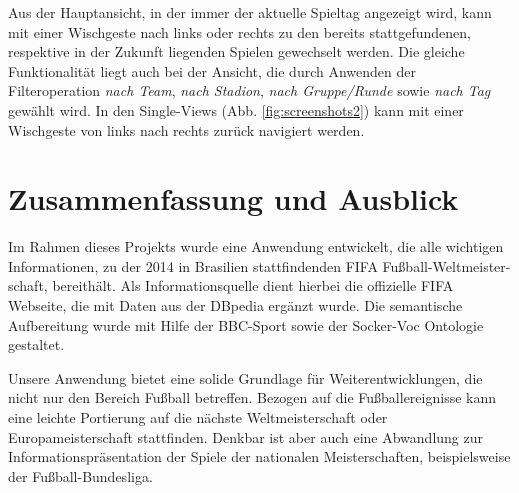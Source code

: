\documentclass[runningheads,a4paper]{llncs}
\begin{document}

Aus der Hauptansicht, in der immer der aktuelle Spieltag angezeigt wird, kann mit einer Wischgeste nach links oder rechts zu den bereits stattgefundenen, respektive in der Zukunft liegenden Spielen gewechselt werden. Die gleiche Funktionalität liegt auch bei der Ansicht, die durch Anwenden der Filteroperation \textit{nach Team}, \textit{nach Stadion}, \textit{nach Gruppe/Runde} sowie \textit{nach Tag} gewählt wird.
In den Single-Views (Abb. \ref{fig:screenshots2}) kann mit einer Wischgeste von links nach rechts zurück navigiert werden.

\newpage

\section{Zusammenfassung und Ausblick}

Im Rahmen dieses Projekts wurde eine Anwendung entwickelt, die alle wichtigen Informationen, zu der 2014 in Brasilien stattfindenden FIFA Fußball-Weltmeister-schaft, bereithält. Als Informationsquelle dient hierbei die offizielle FIFA Webseite, die mit Daten aus der DBpedia ergänzt wurde. Die semantische Aufbereitung wurde mit Hilfe der BBC-Sport sowie der Socker-Voc Ontologie gestaltet.  

Unsere Anwendung bietet eine solide Grundlage für Weiterentwicklungen, die nicht nur den Bereich Fußball betreffen. Bezogen auf die Fußballereignisse kann eine leichte Portierung auf die nächste Weltmeisterschaft oder Europameisterschaft stattfinden. Denkbar ist aber auch eine Abwandlung zur Informationspräsentation der Spiele der nationalen Meisterschaften, beispielsweise der Fußball-Bundesliga.
\end{document}
